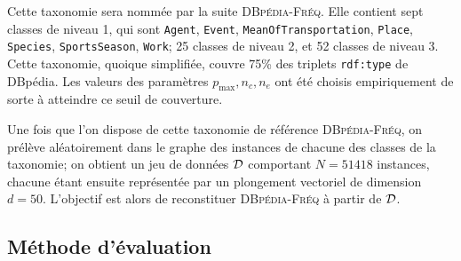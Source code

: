 Cette taxonomie sera nommée par la suite \textsc{DBpédia-Fréq}. Elle contient sept classes de niveau 1, qui sont \texttt{Agent}, \texttt{Event}, \texttt{MeanOfTransportation}, \texttt{Place}, \texttt{Species}, \texttt{SportsSeason}, \texttt{Work}; 25 classes de niveau 2, et 52 classes de niveau 3. Cette taxonomie, quoique simplifiée, couvre 75\% des triplets \texttt{rdf:type} de DBpédia. Les valeurs des paramètres $p_{\max}, n_c, n_e$ ont été choisis empiriquement de sorte à atteindre ce seuil de couverture. 

Une fois que l'on dispose de cette taxonomie de référence \textsc{DBpédia-Fréq}, on prélève aléatoirement dans le graphe des instances de chacune des classes de la taxonomie; on obtient un jeu de données $\cal{D}$ comportant $N = 51 418$ instances, chacune étant ensuite représentée par un plongement vectoriel de dimension $d=50$. L'objectif est alors de reconstituer \textsc{DBpédia-Fréq} à partir de $\cal{D}$.






\subsection{Méthode d'évaluation}
\label{subsec:te-evaluation}

